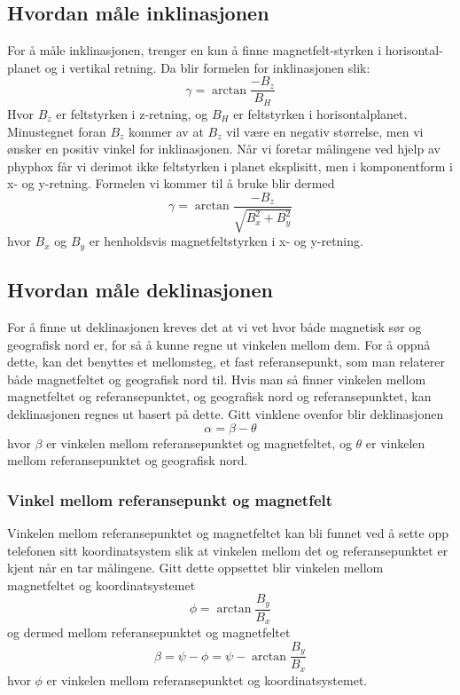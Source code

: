 \subsection{Hvordan måle inklinasjonen}
For å måle inklinasjonen, trenger en kun å finne magnetfelt-styrken i horisontal-
planet og i vertikal retning. Da blir formelen for inklinasjonen slik:
\begin{equation}
    \gamma = \arctan \frac{-B_z}{B_H}
\end{equation}
Hvor $B_z$ er feltstyrken i z-retning, og $B_H$ er feltstyrken i horisontalplanet. 
Minustegnet foran $B_z$ kommer av at $B_z$ vil være en negativ størrelse, men vi 
ønsker en positiv vinkel for inklinasjonen. Når vi foretar målingene ved hjelp av 
phyphox får vi derimot ikke feltstyrken i planet eksplisitt, men i komponentform i 
x- og y-retning. Formelen vi kommer til å bruke blir dermed
\begin{equation}
    \gamma = \arctan{ \frac{-B_z}{\sqrt{B_x^2 + B_y^2}} }
\end{equation}
hvor $B_x$ og $B_y$ er henholdsvis magnetfeltstyrken i x- og y-retning.

\subsection{Hvordan måle deklinasjonen}
For å finne ut deklinasjonen kreves det at vi vet hvor både magnetisk sør og 
geografisk nord er, for så å kunne regne ut vinkelen mellom dem. For å oppnå dette, 
kan det benyttes et mellomsteg, et fast referansepunkt, som man relaterer både 
magnetfeltet og geografisk nord til. Hvis man så finner vinkelen mellom magnetfeltet 
og referansepunktet, og geografisk nord og referansepunktet, kan deklinasjonen 
regnes ut basert på dette. Gitt vinklene ovenfor blir deklinasjonen
\begin{equation}
    \alpha = \beta - \theta
\end{equation}
hvor $\beta$ er vinkelen mellom referansepunktet og magnetfeltet, og $\theta$ er 
vinkelen mellom referansepunktet og geografisk nord.

\subsubsection{Vinkel mellom referansepunkt og magnetfelt}
Vinkelen mellom referansepunktet og magnetfeltet kan bli funnet ved å sette opp 
telefonen sitt koordinatsystem slik at vinkelen mellom det og referansepunktet er 
kjent når en tar målingene. Gitt dette oppsettet blir vinkelen mellom magnetfeltet 
og koordinatsystemet
\begin{equation}
    \phi = \arctan \frac{B_y}{B_x}
\end{equation}
og dermed mellom referansepunktet og magnetfeltet
\begin{equation}
    \beta = \psi - \phi = \psi - \arctan \frac{B_y}{B_x}
\end{equation}
hvor $\phi$ er vinkelen mellom referansepunktet og koordinatsystemet.

